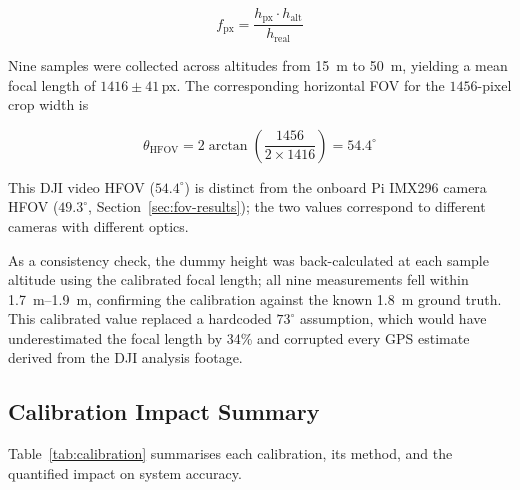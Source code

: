 \begin{equation}\label{eq:dji-focal}
    f_{\text{px}} = \frac{h_{\text{px}} \cdot h_{\text{alt}}}{h_{\text{real}}}
\end{equation}

Nine samples were collected across altitudes from \SI{15}{\metre} to \SI{50}{\metre}, yielding a mean focal length of $1416 \pm 41$\,px. The corresponding horizontal FOV for the $1456$-pixel crop width is

\begin{equation}
    \theta_{\text{HFOV}} = 2\arctan\!\left(\frac{1456}{2 \times 1416}\right) = 54.4^{\circ}
\end{equation}

\noindent This DJI video HFOV ($54.4^{\circ}$) is distinct from the onboard Pi IMX296 camera HFOV ($49.3^{\circ}$, Section~\ref{sec:fov-results}); the two values correspond to different cameras with different optics.

As a consistency check, the dummy height was back-calculated at each sample altitude using the calibrated focal length; all nine measurements fell within \SIrange{1.7}{1.9}{\metre}, confirming the calibration against the known \SI{1.8}{\metre} ground truth. This calibrated value replaced a hardcoded $73^{\circ}$ assumption, which would have underestimated the focal length by 34\% and corrupted every GPS estimate derived from the DJI analysis footage.

\subsection{Calibration Impact Summary}\label{sec:cal:summary}

Table~\ref{tab:calibration} summarises each calibration, its method, and the quantified impact on system accuracy.

